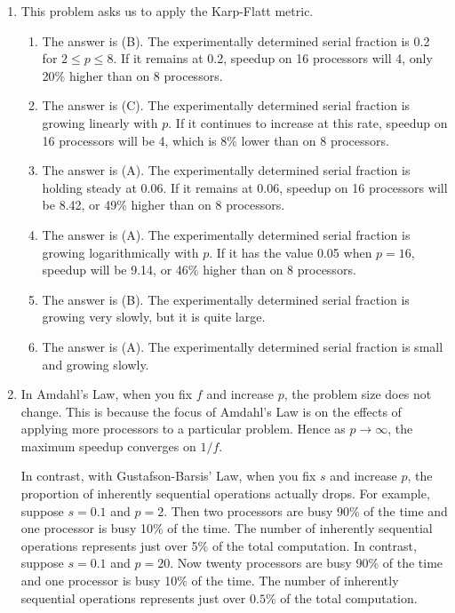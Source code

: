 \begin{enumerate}
\item This problem asks us to apply the Karp-Flatt metric.
      \renewcommand{\theenumii}{\Roman{enumii}}
      \begin{enumerate}
      \item The answer is (B). The experimentally determined serial fraction
            is 0.2 for $2 \le p \le 8$. If it remains at 0.2,
            speedup on 16 processors will 4, only 20\% higher
            than on 8 processors.
      \item The answer is (C). The experimentally determined serial fraction
            is growing linearly with $p$. If it continues to increase at this
            rate, speedup on 16 processors will be 4,
            which is 8\% lower than on 8 processors.
      \item The answer is (A). The experimentally determined
            serial fraction is holding steady at 0.06.
            If it remains at 0.06, speedup on 16 processors will be 8.42,
            or 49\% higher than on 8 processors.
      \item The answer is (A). The experimentally determined
            serial fraction is growing logarithmically
            with $p$. If it has the value 0.05 when $p = 16$, speedup will be
            9.14, or 46\% higher than on 8 processors.
      \item The answer is (B). The experimentally determined serial fraction
            is growing very slowly, but it is quite large.
      \item The answer is (A). The experimentally determined serial fraction
            is small and growing slowly.
      \end{enumerate}

\item In Amdahl's Law, when you fix $f$ and increase $p$, the problem size
      does not change. This is because the focus of Amdahl's Law is on the
      effects of applying more processors to a particular problem.
      Hence as $p \rightarrow \infty$, the maximum speedup converges on $1/f$.

      In contrast, with Gustafson-Barsis' Law, when you fix $s$ and increase
      $p$, the proportion of inherently sequential operations actually drops.
      For example, suppose $s = 0.1$ and $p = 2$. 
      Then two processors are busy 90\% of the time and one processor is busy
      10\% of the time.
      The number of inherently sequential operations represents just over
      5\% of the total computation.
      In contrast, suppose $s = 0.1$ and $p = 20$.
      Now twenty processors are busy 90\% of the time and one processor is
      busy 10\% of the time.
      The number of inherently sequential operations represents just over
      $0.5\%$ of the total computation.


\end{enumerate}
